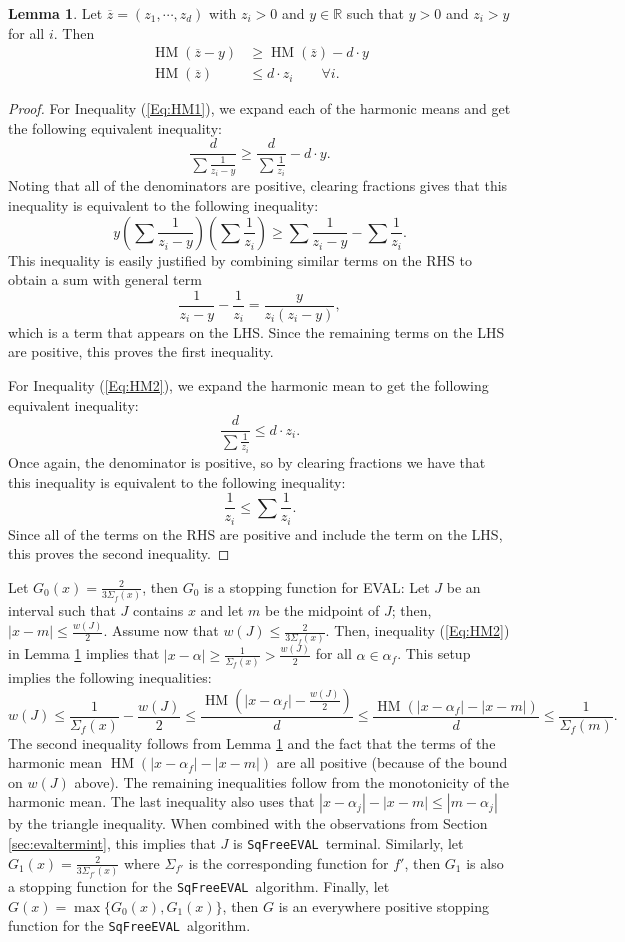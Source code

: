 \documentclass{amsart}
\theoremstyle{definition}
\newtheorem{lemma}{Lemma}[section]
\newcommand{\EVAL}{\texttt{SqFreeEVAL}}
\DeclareMathOperator{\HM}{HM}
\begin{document}
\begin{lemma}\label{lem:HM}
Let $\overline{z}=(z_1,\cdots,z_d)$ with $z_i>0$ and $y\in\mathbb{R}$ such that $y>0$ and $z_i>y$ for all $i$.  Then
\begin{align}
\label{Eq:HM1}\HM(\overline{z}-y)&\geq \HM(\overline{z})-d\cdot y\\
\label{Eq:HM2}\HM(\overline{z})&\leq d\cdot z_i\qquad\forall i.
\end{align}
\begin{proof}
For Inequality (\ref{Eq:HM1}), we expand each of the harmonic means and get the following equivalent inequality:
$$\frac{d}{\sum\frac{1}{z_i-y}}\geq\frac{d}{\sum\frac{1}{z_i}}-d\cdot y.$$
Noting that all of the denominators are positive, clearing fractions gives that this inequality is equivalent to the following inequality:
$$y\left(\sum\frac{1}{z_i-y}\right)\left(\sum\frac{1}{z_i}\right)\geq \sum\frac{1}{z_i-y}-\sum\frac{1}{z_i}.$$
This inequality is easily justified by combining similar terms on the RHS to obtain a sum with general term
$$\frac{1}{z_i-y}-\frac{1}{z_i}=\frac{y}{z_i(z_i-y)},$$
which is a term that appears on the LHS.  Since the remaining terms on the LHS are positive, this proves the first inequality.

For Inequality (\ref{Eq:HM2}), we expand the harmonic mean to get the following equivalent inequality:
$$\frac{d}{\sum\frac{1}{z_i}}\leq d\cdot z_i.$$
Once again, the denominator is positive, so by clearing fractions we have that this inequality is equivalent to the following inequality:
$$\frac{1}{z_i}\leq\sum\frac{1}{z_i}.$$
Since all of the terms on the RHS are positive and include the term on the LHS, this proves the second inequality.
\end{proof}
\end{lemma}

Let $G_0(x)=\frac{2}{3\Sigma_f(x)}$, then $G_0$ is a stopping function for EVAL: Let $J$ be an interval such that $J$ contains $x$ and let $m$ be the midpoint of $J$; then, $|x-m|\leq \frac{w(J)}{2}$.  Assume now that $w(J)\leq\frac{2}{3\Sigma_f(x)}$.  Then, inequality (\ref{Eq:HM2}) in Lemma \ref{lem:HM} implies that $|x-\alpha|\geq\frac{1}{\Sigma_f(x)}>\frac{w(J)}{2}$ for all $\alpha\in\alpha_f$.  This setup implies the following inequalities:
$$w(J)\leq\frac{1}{\Sigma_f(x)}-\frac{w(J)}{2} \leq\frac{\HM(|x-\alpha_f|-\frac{w(J)}{2})}{d} \leq\frac{\HM(|x-\alpha_f|-|x-m|)}{d}
\leq\frac{1}{\Sigma_f(m)}.$$
The second inequality follows from Lemma \ref{lem:HM} and the fact that the terms of the harmonic mean $\HM(|x-\alpha_f|-|x-m|)$ are all positive (because of the bound on $w(J)$ above).  The remaining inequalities follow from the monotonicity of the harmonic mean.  The last inequality also uses that $|x-\alpha_j|-|x-m|\leq|m-\alpha_j|$ by the triangle inequality.  When combined with the observations from Section \ref{sec:evaltermint}, this implies that $J$ is \EVAL\ terminal.  Similarly, let $G_1(x)=\frac{2}{3\Sigma_{f'}(x)}$ where $\Sigma_{f'}$ is the corresponding function for $f'$, then $G_1$ is also a stopping function for the \EVAL\ algorithm.  Finally, let $G(x)=\max\{G_0(x),G_1(x)\}$, then $G$ is an everywhere positive stopping function for the \EVAL\ algorithm.
\end{document}
